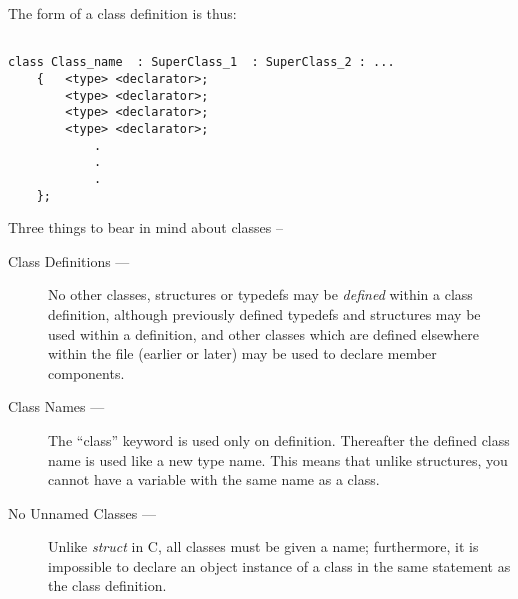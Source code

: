 The form of a class definition is thus:
\begin{verbatim}

class Class_name  : SuperClass_1  : SuperClass_2 : ...
	{	<type> <declarator>;
	 	<type> <declarator>;
	 	<type> <declarator>;
	 	<type> <declarator>;
			.
			.
			.
	};

\end{verbatim}


Three things to bear in mind about classes --
\begin{description}
\item[Class Definitions ---]
No other classes, structures or typedefs may be
{\em defined}
within a class definition, although previously defined typedefs
and structures may be used
within a definition, and other classes which are defined elsewhere
within the file (earlier or later) may be used to declare member components.
\item[Class Names ---]
The ``class'' keyword is used
only on definition.  Thereafter the defined class name is used like a
new type name.  This means that unlike structures,
you cannot have a variable with the same name as a class.
\item[No Unnamed Classes ---]
Unlike
{\em struct}
in C, all classes must be given a name; furthermore, it is impossible to
declare an object instance of a class
in the same statement as the class definition.
\end{description}

